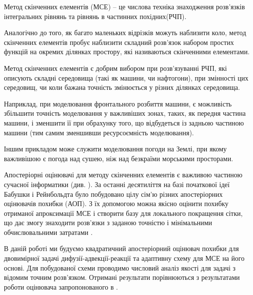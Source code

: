 

Метод скінченних елементів (МСЕ) -- це числова техніка знаходження розв'язків інтегральних рівнянь та рівнянь в частинних похідних(РЧП).

Аналогічно до того, як багато маленьких відрізків можуть наблизити коло, метод скінченних елементів пробує наблизити складний розв'язок набором простих функцій на окремих ділянках простору, які називаються скінченними елементами.

Метод скінченних елементів є добрим вибором при розв'язуванні РЧП, які описують складні середовища (такі як машини, чи нафтогони), при змінності цих середовищ, чи коли бажана точність змінюється у різних ділянках середовища.

Наприклад, при моделювання фронтального розбиття машини, є можливість збільшити точність моделювання у важливіших зонах, таких, як передня частина машини, і зменшити її при обрахунку того, що відбудеться із задньою частиною машини (тим самим зменшивши ресурсоємність моделювання).

Іншим прикладом може служити моделювання погоди на Землі, при якому важливішою є погода над сушею, ніж над безкраїми морськими просторами.

Апостеріорні оцінювачі для методу скінченних елементів є важливою частиною сучасної інформатики (див. \cite{verfurth1996review, verfurth1994posteriori,eriksson1995introduction,ainsworth2011posteriori}). За останні десятиліття на базі початкової ідеї Бабушки і Рейнбольдта \cite{babuvska1978posteriori} було побудовано цілу сім'ю різних апостеріорних оцінювачів похибки (АОП). З їх допомогою можна якісно оцінити похибку отриманої апроксимації МСЕ і створити базу для локального покращення сітки, що дає змогу знаходити розв'язки з заданою точністю і мінімальними обчислювальними затратами \cite{babuska2011finite}.

В даній роботі ми будуємо квадратичний апостеріорний оцінювач похибки для двовимірної задачі дифузії-адвекції-реакції та адаптивну схему для МСЕ на його основі. Для побудованої схеми проводимо числовий аналіз якості для задачі з відомим точним розв'язком.
Отримані результати порівнюються з результатами роботи оцінювача запропонованого в \cite{OstShynAee11}.
